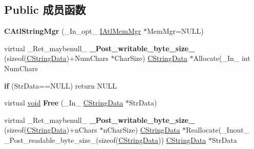 \subsection*{Public 成员函数}
\begin{DoxyCompactItemize}
\item 
\mbox{\label{class_a_t_l_1_1_c_atl_string_mgr_aca302cbe0d38c06515ad7de151fe212c}} 
{\bfseries C\+Atl\+String\+Mgr} (\+\_\+\+In\+\_\+opt\+\_\+ \hyperlink{class_a_t_l_1_1_i_atl_mem_mgr}{I\+Atl\+Mem\+Mgr} $\ast$Mem\+Mgr=N\+U\+LL)
\item 
\mbox{\label{class_a_t_l_1_1_c_atl_string_mgr_aeb381bf21305d109f4a9f8c39c7822f4}} 
virtual \+\_\+\+Ret\+\_\+maybenull\+\_\+ {\bfseries \+\_\+\+Post\+\_\+writable\+\_\+byte\+\_\+size\+\_\+} (sizeof(\hyperlink{struct_a_t_l_1_1_c_string_data}{C\+String\+Data})+Num\+Chars $\ast$Char\+Size) \hyperlink{struct_a_t_l_1_1_c_string_data}{C\+String\+Data} $\ast$Allocate(\+\_\+\+In\+\_\+ int Num\+Chars
\item 
\mbox{\label{class_a_t_l_1_1_c_atl_string_mgr_aad810b1a0d2a02dcb993d2a8252a764d}} 
{\bfseries if} (Str\+Data==N\+U\+LL) return N\+U\+LL
\item 
\mbox{\label{class_a_t_l_1_1_c_atl_string_mgr_a042d507021261d9b056f900da905405a}} 
virtual \hyperlink{interfacevoid}{void} {\bfseries Free} (\+\_\+\+In\+\_\+ \hyperlink{struct_a_t_l_1_1_c_string_data}{C\+String\+Data} $\ast$Str\+Data)
\item 
\mbox{\label{class_a_t_l_1_1_c_atl_string_mgr_adb0a84dfd196eba50fe7147f002147a3}} 
virtual \+\_\+\+Ret\+\_\+maybenull\+\_\+ {\bfseries \+\_\+\+Post\+\_\+writable\+\_\+byte\+\_\+size\+\_\+} (sizeof(\hyperlink{struct_a_t_l_1_1_c_string_data}{C\+String\+Data})+n\+Chars $\ast$n\+Char\+Size) \hyperlink{struct_a_t_l_1_1_c_string_data}{C\+String\+Data} $\ast$Reallocate(\+\_\+\+Inout\+\_\+ \+\_\+\+Post\+\_\+readable\+\_\+byte\+\_\+size\+\_\+(sizeof(\hyperlink{struct_a_t_l_1_1_c_string_data}{C\+String\+Data})) \hyperlink{struct_a_t_l_1_1_c_string_data}{C\+String\+Data} $\ast$Str\+Data
\item 
\mbox{\label{class_a_t_l_1_1_c_atl_string_mgr_a97b2f2fab9113b05d25b6d6f6c1a59bd}} 

\end{DoxyCompactItemize}
